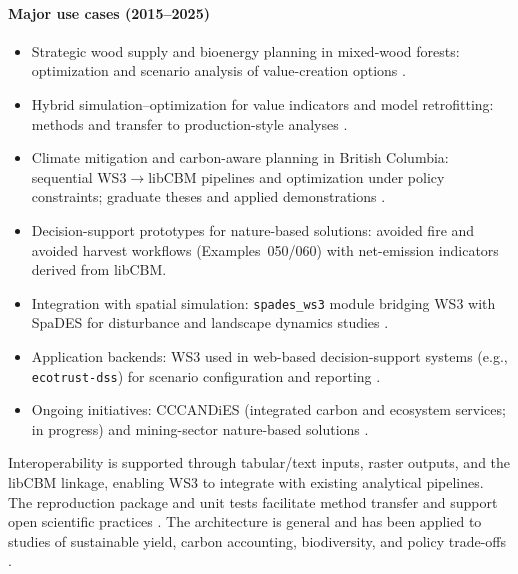 \documentclass[review]{elsarticle}
\begin{document}
\paragraph{Major use cases (2015--2025)}
\begin{itemize}
  \item Strategic wood supply and bioenergy planning in mixed-wood forests: optimization and scenario analysis of value-creation options \citep{cantegril2019bioenergy}.
  \item Hybrid simulation--optimization for value indicators and model retrofitting: methods and transfer to production-style analyses \citep{paradis2018retro, paradis2018estimating}.
  \item Climate mitigation and carbon-aware planning in British Columbia: sequential WS3$\to$libCBM pipelines and optimization under policy constraints; graduate theses and applied demonstrations \citep{ke2024climate, yan2025mathematical, yan_repo}.
  \item Decision-support prototypes for nature-based solutions: avoided fire and avoided harvest workflows (Examples~050/060) with net-emission indicators derived from libCBM.
  \item Integration with spatial simulation: \texttt{spades\_ws3} module bridging WS3 with SpaDES for disturbance and landscape dynamics studies \citep{spades, spades_ws3}.
  \item Application backends: WS3 used in web-based decision-support systems (e.g., \texttt{ecotrust-dss}) for scenario configuration and reporting \citep{ecotrust-dss}.
  \item Ongoing initiatives: CCCANDiES (integrated carbon and ecosystem services; in progress) and mining-sector nature-based solutions \citep{ghasemi2025decarbonization}.
\end{itemize}

Interoperability is supported through tabular/text inputs, raster outputs, and the libCBM linkage, enabling WS3 to integrate with existing analytical pipelines. The reproduction package and unit tests facilitate method transfer and support open scientific practices \citep{hampton2015tao, lowndes2017path}. The architecture is general and has been applied to studies of sustainable yield, carbon accounting, biodiversity, and policy trade-offs \citep{boisvenue2022managing}.
\end{document}
